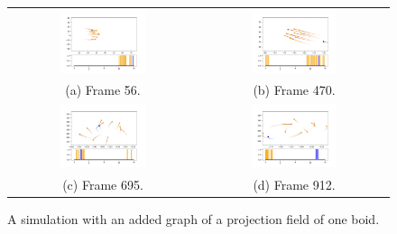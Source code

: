 \documentclass[9pt]{pnas-new}
\begin{document}
\begin{figure}[H]
    \centering
    \begin{tabular}{cc}
        \includegraphics[width=0.47\textwidth]{56.png} &
        \includegraphics[width=0.47\textwidth]{470.png} \\
        (a) Frame 56. & (b) Frame 470. \\
        \includegraphics[width=0.47\textwidth]{695.png} &
        \includegraphics[width=0.47\textwidth]{912.png} \\
        (c) Frame 695. & (d) Frame 912. \\
    \end{tabular}
    \caption{A simulation with an added graph of a projection field of one boid.}
    \label{fig:simulation-multicolored}
\end{figure}
\end{document}
